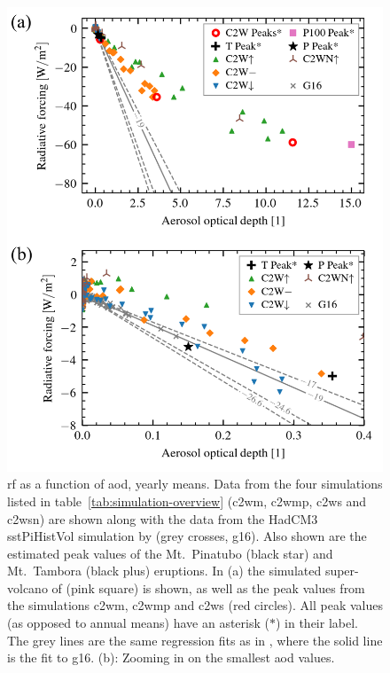 \documentclass{ametsocV6.1}
\begin{document}
\begin{figure}
  \centering
  \includegraphics{figures/figure2.png}

  \caption{\gls{rf} as a function of \gls{aod}, yearly means. Data from the four
    simulations listed in table~\ref{tab:simulation-overview} (\gls{c2wm}, \gls{c2wmp},
    \gls{c2ws} and \gls{c2wsn}) are shown along with the data from the HadCM3 sstPiHistVol
    simulation by \citet{gregory2016} (grey crosses, \gls{g16}). Also shown are the estimated peak
    values of the Mt.\ Pinatubo (black star) and Mt.\ Tambora (black plus) eruptions. In (a)
    the simulated super-volcano of \citet{jones2005} (pink square) is shown, as well as the
    peak values from the simulations \gls{c2wm}, \gls{c2wmp} and \gls{c2ws} (red circles).
    All peak values (as opposed to annual means) have an asterisk (\(\ast{}\)) in their
    label. The grey lines are the same regression fits as in \citet[][Fig.\ 4]{gregory2016},
    where the solid line is the fit to \gls{g16}. (b): Zooming
    in on the smallest \gls{aod} values.}\label{fig:aod_vs_toa_ses_avg}%
\end{figure}
\end{document}

